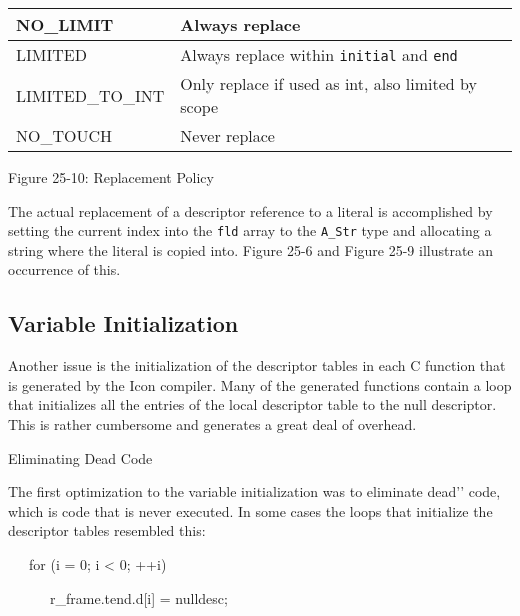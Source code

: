\begin{center}
\tabletail{}
\tablelasttail{}
\begin{supertabular}{|m{1.4670599in}|m{3.2670598in}|}
\hline
{\ttfamily NO\_LIMIT} &
 Always replace\\\hline
{\ttfamily LIMITED} &
 Always replace within \texttt{initial} and \texttt{end}\\\hline
{\ttfamily LIMITED\_TO\_INT} &
 Only replace if used as int, also limited by scope\\\hline
{\ttfamily NO\_TOUCH} &
 Never replace\\\hline
\end{supertabular}
\end{center}
{\centering{}
Figure 25-10: Replacement Policy
\par}


The actual replacement of a descriptor reference to a literal is
accomplished by setting the current index into the \texttt{fld} array
to the \texttt{A\_Str} type and allocating a string where the literal
is copied into. Figure 25-6 and Figure 25-9 illustrate an occurrence
of this.

\subsection{Variable Initialization}

Another issue is the initialization of the descriptor tables in each C
function that is generated by the Icon compiler.  Many of the
generated functions contain a loop that initializes all the entries of
the local descriptor table to the null descriptor. This is rather
cumbersome and generates a great deal of overhead.

{\sffamily
Eliminating Dead Code}


The first optimization to the variable initialization was to eliminate
{\textasciigrave}{\textasciigrave}dead'{}' code, which is code that is
never executed. In some cases the loops that initialize the
descriptor tables resembled this:

{\ttfamily\mdseries
\ \ \ for (i = 0; i {\textless} 0; ++i)}

{\ttfamily\mdseries
\ \ \ \ \ \ r\_frame.tend.d[i] = nulldesc;}


